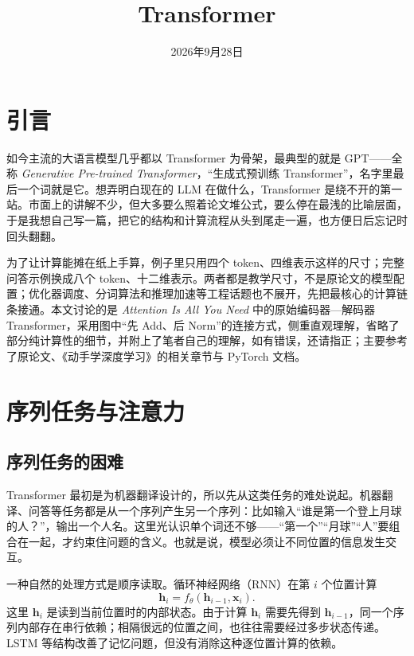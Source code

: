 \documentclass[UTF8,a4paper,12pt]{ctexart}
\title{Transformer}
\date{2026年9月28日}
\numberwithin{equation}{section}
\begin{document}
\maketitle
\section{引言}

如今主流的大语言模型几乎都以 Transformer 为骨架，最典型的就是 GPT——全称 \textit{Generative Pre-trained Transformer}，``生成式预训练 Transformer''，名字里最后一个词就是它。想弄明白现在的 LLM 在做什么，Transformer 是绕不开的第一站。市面上的讲解不少，但大多要么照着论文堆公式，要么停在最浅的比喻层面，于是我想自己写一篇，把它的结构和计算流程从头到尾走一遍，也方便日后忘记时回头翻翻。

为了让计算能摊在纸上手算，例子里只用四个 token、四维表示这样的尺寸；完整问答示例换成八个 token、十二维表示。两者都是教学尺寸，不是原论文的模型配置；优化器调度、分词算法和推理加速等工程话题也不展开，先把最核心的计算链条接通。本文讨论的是 \textit{Attention Is All You Need} 中的原始编码器—解码器 Transformer，采用图中``先 Add、后 Norm''的连接方式，侧重直观理解，省略了部分纯计算性的细节，并附上了笔者自己的理解，如有错误，还请指正；主要参考了原论文、《动手学深度学习》的相关章节与 PyTorch 文档。

\section{序列任务与注意力}

\subsection{序列任务的困难}

Transformer 最初是为机器翻译设计的，所以先从这类任务的难处说起。机器翻译、问答等任务都是从一个序列产生另一个序列：比如输入``谁是第一个登上月球的人？''，输出一个人名。这里光认识单个词还不够——``第一个''``月球''``人''要组合在一起，才约束住问题的含义。也就是说，模型必须让不同位置的信息发生交互。

一种自然的处理方式是顺序读取。循环神经网络（RNN）在第 $i$ 个位置计算
\begin{equation}
\bm h_i=f_\theta(\bm h_{i-1},\bm x_i).
\label{eq:rnn}
\end{equation}
这里 $\bm h_i$ 是读到当前位置时的内部状态。由于计算 $\bm h_i$ 需要先得到 $\bm h_{i-1}$，同一个序列内部存在串行依赖；相隔很远的位置之间，也往往需要经过多步状态传递。LSTM 等结构改善了记忆问题，但没有消除这种逐位置计算的依赖。
\end{document}

